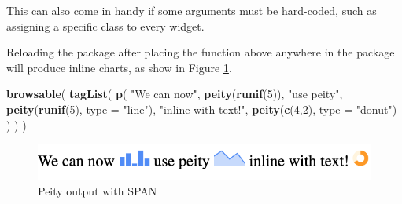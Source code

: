 \documentclass[10pt,]{krantz}
\makeatletter
\newenvironment{Shaded}{\begin{snugshade}}{\end{snugshade}}
\newcommand{\ControlFlowTok}[1]{\textcolor[rgb]{0.27,0.27,0.27}{\textbf{#1}}}
\newcommand{\DataTypeTok}[1]{\textcolor[rgb]{0.27,0.27,0.27}{#1}}
\newcommand{\DecValTok}[1]{\textcolor[rgb]{0.06,0.06,0.06}{#1}}
\newcommand{\KeywordTok}[1]{\textcolor[rgb]{0.27,0.27,0.27}{\textbf{#1}}}
\newcommand{\NormalTok}[1]{#1}
\newcommand{\OperatorTok}[1]{\textcolor[rgb]{0.43,0.43,0.43}{\textbf{#1}}}
\newcommand{\StringTok}[1]{\textcolor[rgb]{0.5,0.5,0.5}{#1}}
\newenvironment{kframe}{%
\medskip{}
\setlength{\fboxsep}{.8em}
 \def\at@end@of@kframe{}%
 \ifinner\ifhmode%
  \def\at@end@of@kframe{\end{minipage}}%
  \begin{minipage}{\columnwidth}%
 \fi\fi%
 \def\FrameCommand##1{\hskip\@totalleftmargin \hskip-\fboxsep
 \colorbox{shadecolor}{##1}\hskip-\fboxsep
     \hskip-\linewidth \hskip-\@totalleftmargin \hskip\columnwidth}%
 \MakeFramed {\advance\hsize-\width
   \@totalleftmargin\z@ \linewidth\hsize
   \@setminipage}}%
 {\par\unskip\endMakeFramed%
 \at@end@of@kframe}
\renewenvironment{Shaded}{\begin{kframe}}{\end{kframe}}
\makeatother
\begin{document}
\begin{Shaded}
\end{Shaded}

This can also come in handy if some arguments must be hard-coded, such as assigning a specific class to every widget.

\begin{Shaded}
\end{Shaded}

Reloading the package after placing the function above anywhere in the package will produce inline charts, as show in Figure \ref{fig:peity-spans}.

\begin{Shaded}
\begin{Highlighting}[]
\KeywordTok{browsable}\NormalTok{(}
  \KeywordTok{tagList}\NormalTok{(}
    \KeywordTok{p}\NormalTok{(}
      \StringTok{"We can now"}\NormalTok{, }\KeywordTok{peity}\NormalTok{(}\KeywordTok{runif}\NormalTok{(}\DecValTok{5}\NormalTok{)),}
      \StringTok{"use peity"}\NormalTok{, }\KeywordTok{peity}\NormalTok{(}\KeywordTok{runif}\NormalTok{(}\DecValTok{5}\NormalTok{), }\DataTypeTok{type =} \StringTok{"line"}\NormalTok{),}
      \StringTok{"inline with text!"}\NormalTok{,}
      \KeywordTok{peity}\NormalTok{(}\KeywordTok{c}\NormalTok{(}\DecValTok{4}\NormalTok{,}\DecValTok{2}\NormalTok{), }\DataTypeTok{type =} \StringTok{"donut"}\NormalTok{)}
\NormalTok{    )}
\NormalTok{  )}
\NormalTok{)}
\end{Highlighting}
\end{Shaded}

\begin{figure}[H]

{\centering \includegraphics[width=1\linewidth]{images/peity-span} 

}

\caption{Peity output with SPAN}\label{fig:peity-spans}
\end{figure}
\end{document}

